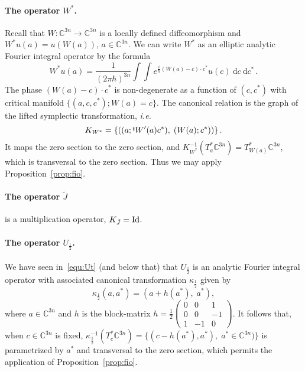 \documentclass{article}
\newcommand{\DD}{\:\!\mathrm{d}}
\newcommand{\trsp}{\raisebox{.6ex}{${\scriptstyle t}$}}
\newcommand{\intint}{\int\!\!\!\!\int}
\newcommand{\CM}{\mathbb{C}}
\newcommand{\h}{\hbar}
\begin{document}
\paragraph{The operator $W^*$.} Recall that $W:\CM^{3n}\to \CM^{3n}$
is a locally defined diffeomorphism and $W^*u(a) = u(W(a))$,
$a\in\CM^{3n}$. We can write $W^*$ as an elliptic analytic Fourier
integral operator by the formula
\[
W^* u (a) = \frac{1}{(2\pi\h)^{3n}}\intint e^{\frac{i}{\h}(W(a) -
  c)\cdot c^*} u(c) \DD c \DD c^*\,.
\]
The phase $(W(a)-c)\cdot c^*$ is non-degenerate as a function of
$(c,c^*)$ with critical manifold $\{(a,c,c^*); W(a)=c\}$. The
canonical relation is the graph of the lifted symplectic
transformation, \emph{i.e.}
\[
K_{W^*} = \{\left( (a; \trsp W'(a) c^*),\; (W(a); c^*) \right)\}\,.
\]
It maps the zero section to the zero section, and
$K_{W^*}^{-1}(T^*_a\CM^{3n}) = T^*_{W(a)}\CM^{3n}$, which is
transversal to the zero section. Thus we may apply
Proposition~\ref{prop:fio}.

\paragraph{The operator $\tilde J$} is a multiplication operator,
$K_{\tilde J}=\textup{Id}$.

\paragraph{The operator $U_{\frac{1}{2}}$.} We have seen
in~\eqref{equ:Ut} (and below that) that $U_{\frac{1}{2}}$ is an
analytic Fourier integral operator with associated canonical
transformation $\kappa_{\frac{1}{2}}$ given by
\[
\kappa_{\frac{1}{2}}(a,a^*) = (a + h(a^*), \; a^*),
\]
where $a\in\CM^{3n}$ and $h$ is the block-matrix
$h= \frac{1}{2}\begin{pmatrix}
  0 & 0 & 1\\
  0 & 0 & -1\\
  1 & -1 & 0
\end{pmatrix}$.
It follows that, when $c\in\CM^{3n}$ is fixed,
$\kappa^{-1}_\frac{1}{2}(T^*_c\CM^{3n}) = \{(c-h(a^*), a^*), \; a^*
\in\CM^{3n})\}$
is parametrized by $a^*$ and transversal to the zero section, which
permits the application of Proposition~\ref{prop:fio}.
\end{document}
